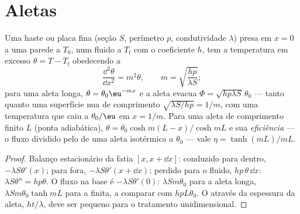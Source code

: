 \section{Aletas}

\begin{proposition}\label{prop:b2:heat-conduction:fin}
Uma haste ou placa fina (seção $S$, perímetro $p$, condutividade $\lambda$)
presa em $x = 0$ a uma parede a $T_0$, num fluido a $T_{\text{f}}$ com
o coeficiente $h$, tem a temperatura em excesso $\theta = T - T_{\text{f}}$
obedecendo a
\[
\frac{\dd^2\theta}{\dd x^2} = m^2\theta, \qquad m = \sqrt{\frac{hp}{\lambda S}} ;
\]
para uma aleta longa, $\theta = \theta_0\eu^{-mx}$ e a aleta evacua $\Phi =
\sqrt{hp\lambda S}\,\theta_0$ --- tanto quanto uma superfície nua de comprimento $\sqrt{\lambda
S/hp} = 1/m$, com uma temperatura que caiu a $\theta_0/\eu$ em
$x = 1/m$. Para uma aleta de comprimento finito $L$ (ponta adiabática), $\theta =
\theta_0\cosh m(L-x)/\cosh mL$ e sua \emph{eficiência} --- o fluxo dividido pelo de uma aleta isotérmica a $\theta_0$ ---
vale $\eta = \tanh(mL)/mL$.
\end{proposition}

\begin{proof}
Balanço estacionário da fatia $[x, x + \dd x]$: conduzido para dentro,
$-\lambda S\theta'(x)$; para fora, $-\lambda S\theta'(x + \dd x)$; perdido para o
fluido, $hp\,\theta\,\dd x$: $\lambda S\theta'' = hp\theta$. O fluxo na
base é $-\lambda S\theta'(0)$: $\lambda Sm\theta_0$ para a aleta longa,
$\lambda Sm\theta_0\tanh mL$ para a finita, a comparar com
$hpL\theta_0$. O  através da espessura da aleta, $ht/\lambda$, deve
ser pequeno para o tratamento unidimensional.
\end{proof}

